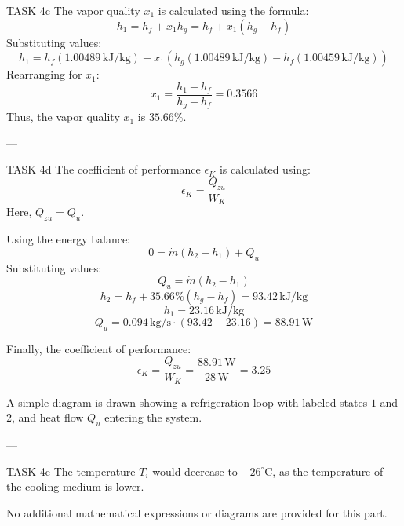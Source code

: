 TASK 4c  
The vapor quality \( x_1 \) is calculated using the formula:  
\[
h_1 = h_f + x_1 h_g = h_f + x_1 (h_g - h_f)
\]  
Substituting values:  
\[
h_1 = h_f (1.00489 \, \text{kJ/kg}) + x_1 (h_g (1.00489 \, \text{kJ/kg}) - h_f (1.00459 \, \text{kJ/kg}))
\]  
Rearranging for \( x_1 \):  
\[
x_1 = \frac{h_1 - h_f}{h_g - h_f} = 0.3566
\]  
Thus, the vapor quality \( x_1 \) is \( 35.66\% \).  

---

TASK 4d  
The coefficient of performance \( \epsilon_K \) is calculated using:  
\[
\epsilon_K = \frac{Q_{zu}}{W_K}
\]  
Here, \( Q_{zu} = Q_u \).  

Using the energy balance:  
\[
0 = \dot{m}(h_2 - h_1) + Q_u
\]  
Substituting values:  
\[
Q_u = \dot{m}(h_2 - h_1)
\]  
\[
h_2 = h_f + 35.66\% (h_g - h_f) = 93.42 \, \text{kJ/kg}
\]  
\[
h_1 = 23.16 \, \text{kJ/kg}
\]  
\[
Q_u = 0.094 \, \text{kg/s} \cdot (93.42 - 23.16) = 88.91 \, \text{W}
\]  

Finally, the coefficient of performance:  
\[
\epsilon_K = \frac{Q_{zu}}{W_K} = \frac{88.91 \, \text{W}}{28 \, \text{W}} = 3.25
\]  

A simple diagram is drawn showing a refrigeration loop with labeled states \( 1 \) and \( 2 \), and heat flow \( Q_u \) entering the system.  

---

TASK 4e  
The temperature \( T_i \) would decrease to \( -26^\circ\text{C} \), as the temperature of the cooling medium is lower.  

No additional mathematical expressions or diagrams are provided for this part.